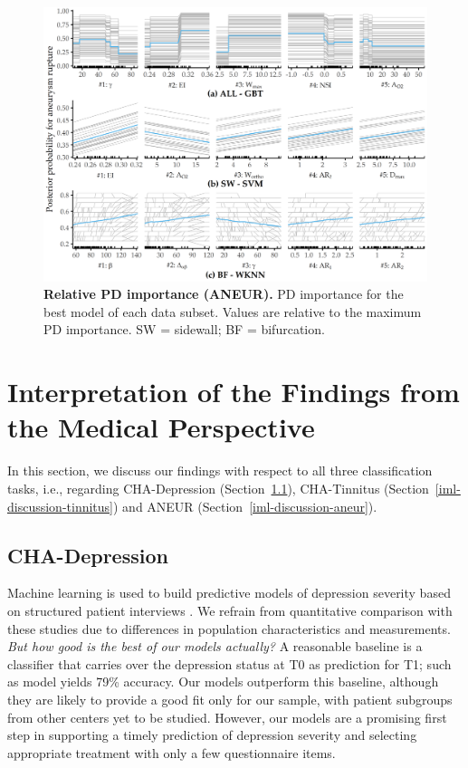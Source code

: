 \documentclass[
  oneside]{book}
\begin{document}
\begin{figure}[htb]

{\centering \includegraphics[width=1\linewidth]{figures/08-pd-local-aneur} 

}

\caption{\textbf{Relative PD importance (ANEUR).} PD importance for the best model of each data subset. Values are relative to the maximum PD importance. SW = sidewall; BF = bifurcation.}\label{fig:08-pd-local-aneur}
\end{figure}

\hypertarget{iml-discussion}{%
\section{Interpretation of the Findings from the Medical Perspective}\label{iml-discussion}}

In this section, we discuss our findings with respect to all three classification tasks, i.e., regarding
CHA-Depression (Section~\ref{iml-discussion-depression}), CHA-Tinnitus (Section~\ref{iml-discussion-tinnitus}) and
ANEUR (Section~\ref{iml-discussion-aneur}).

\hypertarget{iml-discussion-depression}{%
\subsection{CHA-Depression}\label{iml-discussion-depression}}

Machine learning is used to build predictive models of depression severity based on structured patient interviews \autocite{VanLoo:depression_pred2014,Kessler:MLDepression2016}.
We refrain from quantitative comparison with these studies due to differences in population characteristics and measurements.
\emph{But how good is the best of our models actually?}
A reasonable baseline is a classifier that carries over the depression status at T0 as prediction for T1; such as model yields 79\% accuracy.
Our models outperform this baseline, although they are likely to provide a good fit only for our sample, with patient subgroups from other centers yet to be studied.
However, our models are a promising first step in supporting a timely prediction of depression severity and selecting appropriate treatment with only a few questionnaire items.
\end{document}
